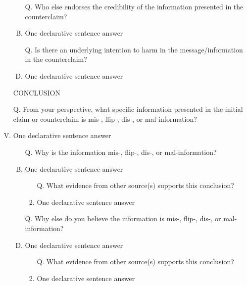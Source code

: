 \documentclass[a4paper, 12pt]{article}
\begin{document}
\begin{CJK*}{UTF8}{bsmi}
\begin{enumerate}[I.]
\begin{enumerate}[A.]
                        \item [Q.] Who else endorses the credibility of the information presented in the {\color{red}counterclaim}?
                        \item {\color{gray} One declarative sentence answer}
                        \item [Q.] Is there an underlying intention to harm in the message/information in the {\color{red}counterclaim}?
                        \item {\color{gray} One declarative sentence answer}
                  \end{enumerate}
            \item [] %
            \item [] CONCLUSION
            \item [Q.] From your perspective, what specific information presented in the {\color{blue}initial claim} or {\color{red}counterclaim}
                  is {\color{blue} mis}-, {\color{blue}flip}-, {\color{blue}dis}-, or {\color{blue}mal}-information?
            \item {\color{gray} One declarative sentence answer} %
                  \begin{enumerate}[A.]
                        \item [Q.] Why is the information {\color{blue} mis}-, {\color{blue}flip}-, {\color{blue}dis}-, or {\color{blue}mal}-information?
                        \item {\color{gray} One declarative sentence answer} %
                              \begin{enumerate}[1.]
                                    \item [Q.] What evidence from other source(s) supports this conclusion?
                                    \item {\color{gray} One declarative sentence answer} %
                              \end{enumerate}
                        \item [Q.] Why else do you believe the information is {\color{blue} mis}-, {\color{blue}flip}-, {\color{blue}dis}-, or {\color{blue}mal}-information?
                        \item {\color{gray} One declarative sentence answer} %
                              \begin{enumerate}[1.]
                                    \item [Q.] What evidence from other source(s) supports this conclusion?
                                    \item {\color{gray} One declarative sentence answer} %
                              \end{enumerate}
                  \end{enumerate}
      \end{enumerate}


\end{CJK*}
\end{document}
